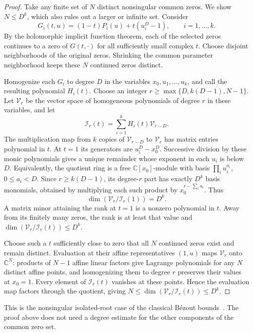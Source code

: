 \begin{proof}
Take any finite set of $N$ distinct nonsingular common zeros. We show
$N\le D^k$, which also rules out a larger or infinite set. Consider
\[
 G_i(t,u)=(1-t)P_i(u)+t(u_i^D-1),\qquad i=1,\ldots,k.
\]
By the holomorphic implicit function theorem, each of the selected zeros
continues to a zero of $G(t,\cdot)$ for all sufficiently small complex $t$.
Choose disjoint neighborhoods of the original zeros. Shrinking the common
parameter neighborhood keeps these $N$ continued zeros distinct.

Homogenize each $G_i$ to degree $D$ in the variables $x_0,u_1,\ldots,u_k$,
and call the resulting polynomial $H_i(t)$. Choose an integer
$r\ge\max\{D,k(D-1),N-1\}$. Let $\mathcal V_r$ be the vector space of
homogeneous polynomials of degree $r$ in these variables, and let
\[
 \mathcal I_r(t)=\sum_{i=1}^k H_i(t)\mathcal V_{r-D}.
\]
The multiplication map from $k$ copies of $\mathcal V_{r-D}$ to
$\mathcal V_r$ has matrix entries polynomial in $t$. At $t=1$ its generators
are $u_i^D-x_0^D$. Successive division by these monic polynomials gives a
unique remainder whose exponent in each $u_i$ is below $D$. Equivalently,
the quotient ring is a free $\mathbb C[x_0]$-module with basis
$\prod_i u_i^{a_i}$, $0\le a_i<D$. Since $r\ge k(D-1)$, its degree-$r$
part has exactly $D^k$ basis monomials, obtained by multiplying each such
product by $x_0^{r-\sum_i a_i}$. Thus
\[
 \dim(\mathcal V_r/\mathcal I_r(1))=D^k.
\]
A matrix minor attaining the rank at $t=1$ is a nonzero polynomial in $t$.
Away from its finitely many zeros, the rank is at least that value and
$\dim(\mathcal V_r/\mathcal I_r(t))\le D^k$.

Choose such a $t$ sufficiently close to zero that all $N$ continued zeros
exist and remain distinct. Evaluation at their affine representatives
$(1,u)$ maps $\mathcal V_r$ onto $\mathbb C^N$: products of $N-1$ affine
linear factors give Lagrange polynomials for any $N$ distinct affine points,
and homogenizing them to degree $r$ preserves their values at $x_0=1$.
Every element of $\mathcal I_r(t)$ vanishes at these points. Hence the
evaluation map factors through the quotient, giving
$N\le\dim(\mathcal V_r/\mathcal I_r(t))\le D^k$.
\end{proof}

This is the nonsingular isolated-root case of the classical B\'ezout
bounds~\citep{fulton1998-intersection-theory}. The proof above does not need
a degree estimate for the other components of the common zero set.

